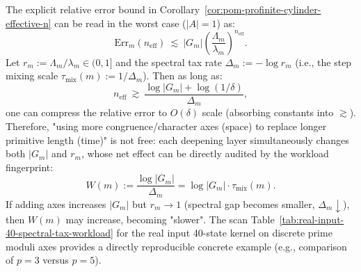 \begin{remark}\label{rem:pom-spectral-tax-workload}
The explicit relative error bound in Corollary~\ref{cor:pom-profinite-cylinder-effective-n} can be read in the worst case ($|A|=1$) as:
\[
\mathrm{Err}_m(n_{\mathrm{eff}})\ \lesssim\ |G_m|\left(\frac{\Lambda_m}{\lambda_m}\right)^{n_{\mathrm{eff}}}.
\]
Let
\(
r_m:=\Lambda_m/\lambda_m\in(0,1]
\)
and the spectral tax rate
\(
\Delta_m:=-\log r_m
\)
(i.e., the step mixing scale $\tau_{\mathrm{mix}}(m):=1/\Delta_m$).
Then as long as:
\[
n_{\mathrm{eff}}\ \gtrsim\ \frac{\log|G_m|+\log(1/\delta)}{\Delta_m},
\]
one can compress the relative error to $O(\delta)$ scale (absorbing constants into $\gtrsim$).
Therefore, "using more congruence/character axes (space) to replace longer primitive length (time)" is not free: each deepening layer simultaneously changes both
$|G_m|$ and $r_m$, whose net effect can be directly audited by the workload fingerprint:
\[
W(m):=\frac{\log|G_m|}{\Delta_m}=\log|G_m|\cdot\tau_{\mathrm{mix}}(m).
\]
If adding axes increases $|G_m|$ but $r_m\to 1$ (spectral gap becomes smaller, $\Delta_m\downarrow$), then $W(m)$ may increase, becoming "slower".
The scan Table~\ref{tab:real-input-40-spectral-tax-workload} for the real input 40-state kernel on discrete prime moduli axes provides a directly reproducible concrete example (e.g., comparison of $p=3$ versus $p=5$).
\end{remark}


